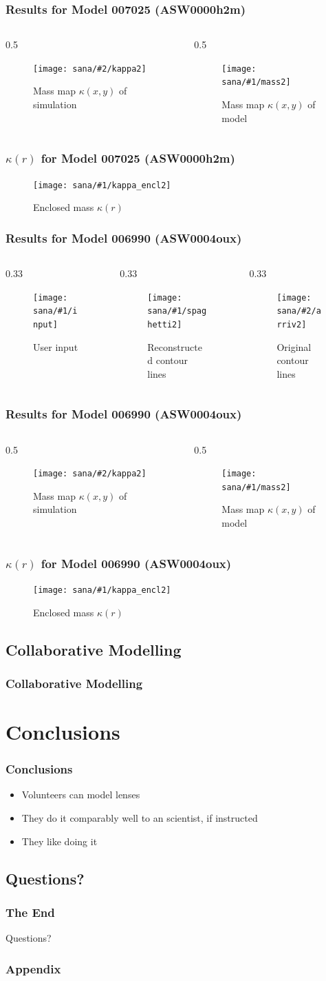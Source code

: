 \documentclass[aspectratio=1610]{beamer}
\newcommand{\resframea}[2]{
\begin{frame}
  \frametitle{Results for Model #1 (#2)}
  \begin{columns}[T]\begin{column}{0.33\textwidth}
    \begin{figure}
      \texttt{[image: sana/\#1/input]}
      \caption{User input}
    \end{figure}
  \end{column}\begin{column}{0.33\textwidth}
    \begin{figure}
      \texttt{[image: sana/\#1/spaghetti2]}
      \caption{Reconstructed contour lines}
    \end{figure}
  \end{column}\begin{column}{0.33\textwidth}
    \begin{figure}
      \texttt{[image: sana/\#2/arriv2]}
      \caption{Original contour lines}
    \end{figure}
  \end{column}\end{columns}
\end{frame}
}
\newcommand{\resframeb}[2]{
\begin{frame}
  \frametitle{Results for Model #1 (#2)}
  \begin{columns}[T]\begin{column}{0.5\textwidth}
    \begin{figure}
      \texttt{[image: sana/\#2/kappa2]}
      \caption{Mass map $\kappa\left(x,y\right)$ of simulation}
    \end{figure}
  \end{column}\begin{column}{0.5\textwidth}
    \begin{figure}
      \texttt{[image: sana/\#1/mass2]}
      \caption{Mass map $\kappa\left(x,y\right)$ of model}
    \end{figure}
  \end{column}
  \end{columns}
\end{frame}

\begin{frame}
  \frametitle{$\kappa\left(r\right)$ for Model #1 (#2)}
    \begin{figure}
      \texttt{[image: sana/\#1/kappa\_encl2]}
      \caption{Enclosed mass $\kappa\left(r\right)$}
    \end{figure}
\end{frame}
}
\begin{document}
\resframeb{007025}{ASW0000h2m}
%


\resframea{006990}{ASW0004oux}
\resframeb{006990}{ASW0004oux}




\subsection{Collaborative Modelling}
\begin{frame}
  \frametitle{Collaborative Modelling}
\end{frame}

\section*{Conclusions}

\begin{frame}
  \frametitle{Conclusions}
  \begin{itemize}
    \item Volunteers can model lenses
    \item They do it comparably well to an scientist, if instructed
    \item They like doing it
  \end{itemize}
\end{frame}

\subsection*{Questions?}

\begin{frame}
  \frametitle{The End}
  Questions?
\end{frame}




\appendix

\begin{frame}
  \frametitle{Appendix}
\end{frame}
\end{document}
